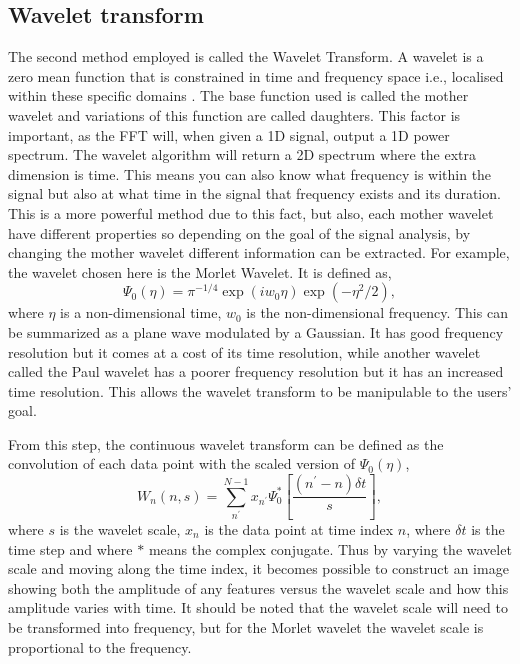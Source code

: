 \subsection{Wavelet transform}

	The second method employed is called the Wavelet Transform.
	A wavelet is a zero mean function that is constrained in time and frequency space i.e., localised within these specific domains \citep{farge1992wavelet}.
	The base function used is called the mother wavelet and variations of this function are called daughters.
	This factor is important, as the FFT will, when given a 1D signal, output a 1D power spectrum.
	The wavelet algorithm will return a 2D spectrum where the extra dimension is time.
	This means you can also know what frequency is within the signal but also at what time in the signal that frequency exists and its duration.
	This is a more powerful method due to this fact, but also, each mother wavelet have different properties so depending on the goal of the signal analysis, by changing the mother wavelet different information can be extracted. 
	For example, the wavelet chosen here is the Morlet Wavelet.
	It is defined as,
	\begin{equation}
		\Psi_0(\eta) = \pi^{-1/4} \exp(iw_0\eta)\exp(-\eta^2/2),
	\end{equation}
    where $\eta$ is a non-dimensional time, $w_0$ is the non-dimensional frequency.
    This can be summarized as a plane wave modulated by a Gaussian.
	It has good frequency resolution but it comes at a cost of its time resolution, while another wavelet called the Paul wavelet has a poorer frequency resolution but it has an increased time resolution.
	This allows the wavelet transform to be manipulable to the users' goal.
    
    From this step, the continuous wavelet transform can be defined as the convolution of each data point with the scaled version of $\Psi_0(\eta)$,
	\begin{equation}
		W_n (n, s) = \sum_{n^\prime}^{N-1} x_{n^\prime}\Psi_{0}^{*} \left[\frac{(n^\prime-n)\delta t}{s}\right],
	\end{equation}
    where $s$ is the wavelet scale, $x_n$ is the data point at time index $n$, where $\delta t$ is the time step and where $*$ means the complex conjugate. 
    Thus by varying the wavelet scale and moving along the time index, it becomes possible to construct an image showing both the amplitude of any features versus the wavelet scale and how this amplitude varies with time. 
    It should be noted that the wavelet scale will need to be transformed into frequency, but for the Morlet wavelet the wavelet scale is proportional to the frequency.
    
